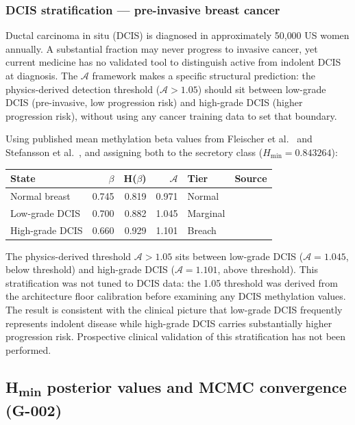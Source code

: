 \documentclass[12pt,a4paper]{article}
\newcommand{\Hmin}{H_{\min}}
\newcommand{\Ascore}{\mathcal{A}}
\begin{document}
\subsubsection{DCIS stratification --- pre-invasive breast cancer}

Ductal carcinoma in situ (DCIS) is diagnosed in approximately 50{,}000 US women
annually. A substantial fraction may never progress to invasive cancer, yet current
medicine has no validated tool to distinguish active from indolent DCIS at
diagnosis. The $\Ascore$ framework makes a specific structural prediction: the
physics-derived detection threshold ($\Ascore > 1.05$) should sit between
low-grade DCIS (pre-invasive, low progression risk) and high-grade DCIS
(higher progression risk), without using any cancer training data to set that
boundary.

Using published mean methylation beta values from Fleischer et al.~\cite{Fleischer2017}
and Stefansson et al.~\cite{Stefansson2015}, and assigning both to the
secretory class ($\Hmin = 0.843264$):

\begin{center}
{\small\begin{tabular}{@{}p{3.6cm}rrrp{1.9cm}p{2.5cm}@{}}
\toprule
\textbf{State} & \textbf{$\beta$} & \textbf{H($\beta$)} &
\textbf{$\Ascore$} & \textbf{Tier} & \textbf{Source} \\
\midrule
Normal breast           & 0.745 & 0.819 & 0.971 & Normal &
  \cite{Roadmap2015} \\
Low-grade DCIS          & 0.700 & 0.882 & 1.045 & Marginal &
  \cite{Fleischer2017} \\
High-grade DCIS         & 0.660 & 0.929 & 1.101 & Breach &
  \cite{Stefansson2015} \\
\bottomrule
\end{tabular}}
\end{center}

The physics-derived threshold $\Ascore > 1.05$ sits between low-grade DCIS
($\Ascore = 1.045$, below threshold) and high-grade DCIS ($\Ascore = 1.101$,
above threshold). This stratification was not tuned to DCIS data: the 1.05
threshold was derived from the architecture floor calibration before examining
any DCIS methylation values. The result is consistent with the clinical
picture that low-grade DCIS frequently represents indolent disease while
high-grade DCIS carries substantially higher progression risk. Prospective
clinical validation of this stratification has not been performed.

\subsection{H\textsubscript{min} posterior values and MCMC convergence (G-002)}
\label{sec:g002results}
\end{document}
